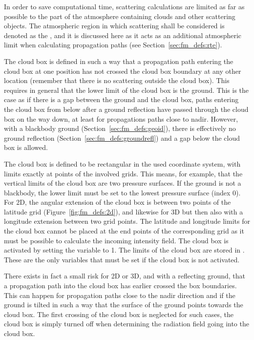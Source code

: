 \label{sec:fm_defs:cloudbox}

In order to save computational time, scattering calculations are
limited as far as possible to the part of the atmosphere containing
clouds and other scattering objects. The atmospheric region in which
scattering shall be considered is denoted as the ,
and it is discussed here as it acts as an additional atmospheric limit
when calculating propagation paths (see
Section~\ref{sec:fm_defs:rte}).

The cloud box is defined in such a way that a propagation path entering
the cloud box at one position has not crossed the cloud box boundary
at any other location (remember that there is no scattering outside
the cloud box). This requires in general that the lower limit of the
cloud box is the ground. This is the case as if there is a gap between
the ground and the cloud box, paths entering the cloud box from below
after a ground reflection have passed through the cloud box on the way
down, at least for propagations paths close to nadir. However, with a
blackbody ground (Section~\ref{sec:fm_defs:geoid}), there is
effectively no ground reflection
(Section~\ref{sec:fm_defs:groundrefl}) and a gap below the cloud box
is allowed.

The cloud box is defined to be rectangular in the used coordinate
system, with limits exactly at points of the involved grids. This
means, for example, that the vertical limits of the cloud box are two
pressure surfaces. If the ground is not a blackbody, the lower limit
must be set to the lowest pressure surface (index 0). For 2D, the
angular extension of the cloud box is between two points of the
latitude grid (Figure~\ref{fig:fm_defs:2d}), and likewise for 3D but
then also with a longitude extension between two grid points.  The
latitude and longitude limits for the cloud box cannot be placed at
the end points of the corresponding grid as it must be possible to
calculate the incoming intensity field. The cloud box is activated by
setting the variable  to 1. The limits of the
cloud box are stored in . These are the only
variables that must be set if the cloud box is not activated.

There exists in fact a small risk for 2D or 3D, and with a reflecting
ground, that a propagation path into the cloud box has earlier crossed
the box boundaries. This can happen for propagation paths close to the
nadir direction and if the ground is tilted in such a way that the
surface of the ground points towards the cloud box. The first crossing
of the cloud box is neglected for such cases, the cloud box is simply
turned off when determining the radiation field going into the cloud
box.


